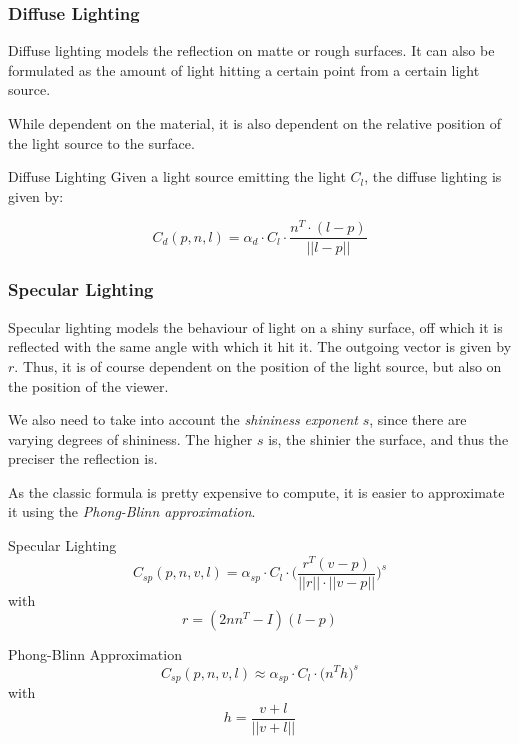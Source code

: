 \documentclass{panikzettel}
\begin{document}
\begin{halfboxl}
\vspace{-\baselineskip}

\subsubsection*{Diffuse Lighting}


Diffuse lighting models the reflection on matte or rough surfaces. It can also be formulated as the amount of light hitting a certain point from a certain light source.

While dependent on the material, it is also dependent on the relative position of the light source to the surface.
\end{halfboxl}%
\begin{halfboxr}
\vspace{-\baselineskip}
\begin{defi}{Diffuse Lighting}
Given a light source emitting the light $C_l$, the diffuse lighting is given by:

$$C_d(p,n,l) = \alpha_d \cdot C_l \cdot \frac{n^T \cdot (l-p)}{||l-p||}$$
\end{defi}
\end{halfboxr}

\subsubsection*{Specular Lighting}

\begin{halfboxl}
Specular lighting models the behaviour of light on a shiny surface, off which it is reflected with the same angle with which it hit it. The outgoing vector is given by $r$. Thus, it is of course dependent on the position of the light source, but also on the position of the viewer.

We also need to take into account the \emph{shininess exponent} $s$, since there are varying degrees of shininess. The higher $s$ is, the shinier the surface, and thus the preciser the reflection is.

As the classic formula is pretty expensive to compute, it is easier to approximate it using the \emph{Phong-Blinn approximation}.
\end{halfboxl}%
\begin{halfboxr}
\vspace{-\baselineskip}
\begin{defi}{Specular Lighting}
$$C_{sp} (p,n,v,l) = \alpha_{sp} \cdot C_l \cdot \bigg(\frac{r^T(v-p)}{||r||\cdot||v-p||}\bigg)^s$$ with $$r = (2nn^T-I)(l-p)$$
\end{defi}

\begin{defi}{Phong-Blinn Approximation}
$$C_{sp}(p,n,v,l) \approx \alpha_{sp}  \cdot C_l \cdot \big(n^Th\big)^s$$ with $$h= \frac{v + l}{||v + l||}$$
\end{defi}
\end{halfboxr}
\end{document}
